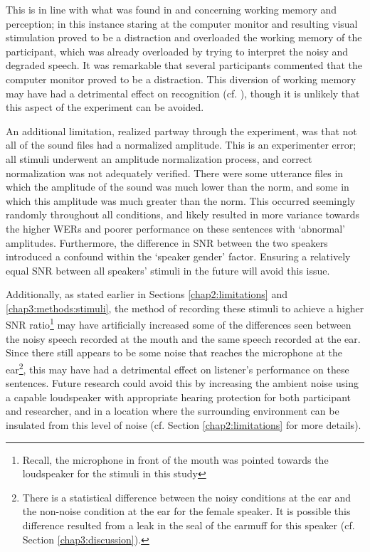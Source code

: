 This is in line with what was found in \cite{francis:09} and \cite{francis:10} concerning working memory and perception; in this instance staring at the computer monitor and resulting visual stimulation proved to be a distraction and overloaded the working memory of the participant, which was already overloaded by trying to interpret the noisy and degraded speech.  It was remarkable that several participants commented that the computer monitor proved to be a distraction.  This diversion of working memory may have had a detrimental effect on recognition (cf. \cite{caplan:99}), though it is unlikely that this aspect of the experiment can be avoided.

An additional limitation, realized partway through the experiment, was that not all of the sound files had a normalized amplitude.  This is an experimenter error; all stimuli underwent an amplitude normalization process, and correct normalization was not adequately verified. There were some utterance files in which the amplitude of the sound was much lower than the norm, and some in which this amplitude was much greater than the norm.  This occurred seemingly randomly throughout all conditions, and likely resulted in more variance towards the higher WERs and poorer performance on these sentences with `abnormal' amplitudes.  Furthermore, the difference in SNR between the two speakers introduced a confound within the `speaker gender' factor.  Ensuring a relatively equal SNR between all speakers' stimuli in the future will avoid this issue.

Additionally, as stated earlier in Sections \ref{chap2:limitations} and \ref{chap3:methods:stimuli}, the method of recording these stimuli to achieve a higher SNR ratio\footnote{Recall, the microphone in front of the mouth was pointed towards the loudspeaker for the stimuli in this study} may have artificially increased some of the differences seen between the noisy speech recorded at the mouth and the same speech recorded at the ear.  Since there still appears to be some noise that reaches the microphone at the ear\footnote{There is a statistical difference between the noisy conditions at the ear and the non-noise condition at the ear for the female speaker. It is possible this difference resulted from a leak in the seal of the earmuff for this speaker (cf. Section \ref{chap3:discussion}).}, this may have had a detrimental effect on listener's performance on these sentences.  Future research could avoid this by increasing the ambient noise using a capable loudspeaker with appropriate hearing protection for both participant and researcher, and in a location where the surrounding environment can be insulated from this level of noise (cf. Section \ref{chap2:limitations} for more details).


